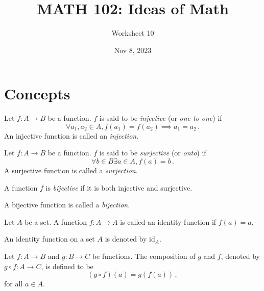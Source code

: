 \documentclass[12pt]{amsart}
\title{ MATH 102: Ideas  of Math }
\author{ Worksheet 10 }
\date{Nov 8, 2023}
\begin{document}
\maketitle

\section{Concepts}

    \begin{definition}
        Let $f:A\to B$ be a function.
        $f$ is said to be \emph{injective} (or \emph{one-to-one})
        if 
        \begin{equation*}
            \forall a_1, a_2 \in A, f(a_1) = f(a_2) \implies a_1 = a_2 \,.
        \end{equation*}
        An injective function is called an \emph{injection}.
    \end{definition}


    \begin{definition}
        Let $f:A\to B$ be a function.
        $f$ is said to be \emph{surjective} (or \emph{onto}) if
        \begin{equation*}
            \forall b\in B \exists a \in A, f(a) = b \,.
        \end{equation*}
        A surjective function is called a \emph{surjection}.
    \end{definition}

    \begin{definition}
        A function $f$ is \emph{bijective} if 
        it is both injective and surjective.

        A bijective function is called a \emph{bijection}.
    \end{definition}

    \begin{definition}
        Let $A$ be a set. A function $f:A \to A$ is called an identity function if $f(a) =a$.

        An identity function on a set $A$ is denoted by $\text{id}_A$.
    \end{definition}


    \begin{definition}
        Let $f:A\to B$ and $g:B\to C$ be functions.
       The composition of $g$ and $f$, denoted by $g\circ f: A\to C$, is defined
       to be
       $$(g\circ f)(a) = g(f(a))\,,$$
       for all $a\in A$.
    \end{definition}
\end{document}
